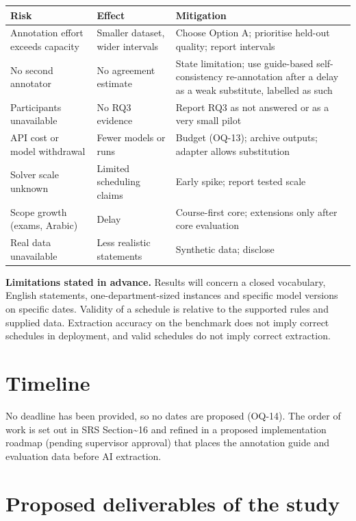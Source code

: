 \documentclass[
  11pt,a4paper,oneside]{report}
\begin{document}
\begin{longtable}[]{@{}p{\dimexpr(\linewidth-6\tabcolsep)/3\relax}p{\dimexpr(\linewidth-6\tabcolsep)/3\relax}p{\dimexpr(\linewidth-6\tabcolsep)/3\relax}@{}}
\toprule\noalign{}
Risk & Effect & Mitigation \\
\midrule\noalign{}
\endhead
\bottomrule\noalign{}
\endlastfoot
Annotation effort exceeds capacity & Smaller dataset, wider intervals &
Choose Option A; prioritise held-out quality; report intervals \\
No second annotator & No agreement estimate & State limitation; use
guide-based self-consistency re-annotation after a delay as a weak
substitute, labelled as such \\
Participants unavailable & No RQ3 evidence & Report RQ3 as not answered
or as a very small pilot \\
API cost or model withdrawal & Fewer models or runs & Budget (OQ-13);
archive outputs; adapter allows substitution \\
Solver scale unknown & Limited scheduling claims & Early spike; report
tested scale \\
Scope growth (exams, Arabic) & Delay & Course-first core; extensions
only after core evaluation \\
Real data unavailable & Less realistic statements & Synthetic data;
disclose \\
\end{longtable}

\textbf{Limitations stated in advance.} Results will concern a closed
vocabulary, English statements, one-department-sized instances and
specific model versions on specific dates. Validity of a schedule is
relative to the supported rules and supplied data. Extraction accuracy
on the benchmark does not imply correct schedules in deployment, and
valid schedules do not imply correct extraction.

\hypertarget{timeline}{%
\section{Timeline}\label{timeline}}

No deadline has been provided, so no dates are proposed (OQ-14). The
order of work is set out in SRS Section\textasciitilde16 and refined in a
proposed implementation roadmap (pending supervisor approval) that places
the annotation guide and evaluation data before AI extraction.

\hypertarget{proposed-deliverables-of-the-study}{%
\section{Proposed deliverables of the
study}\label{proposed-deliverables-of-the-study}}
\end{document}
